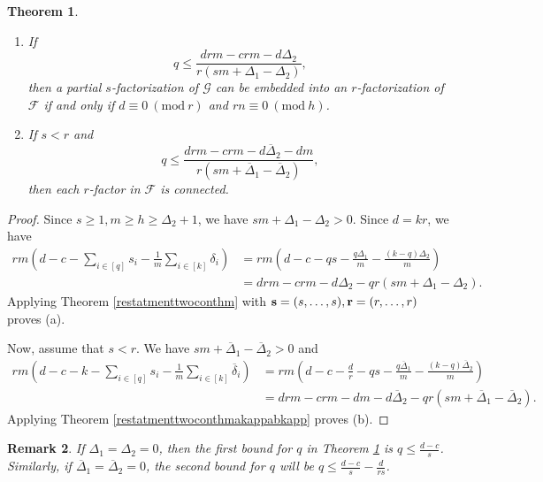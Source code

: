 \documentclass[12pt,oneside]{amsart}
\newtheorem{theorem}{Theorem}[section]
\newtheorem{remark}[theorem]{Remark}
\newcommand{\Mod}[1]{\ (\mathrm{mod}\ #1)}
\newcommand{\cc}{\mathcal}
\begin{document}
\begin{theorem} \label{rssimpleineqthm}
\begin{enumerate}
    \item [\textup{(a)}] If $$q\leq \dfrac{drm-crm- d \Delta_2}{r(sm+\Delta_1-\Delta_2)},$$ then  a partial $s$-factorization of $\cc G$ can be embedded into an  $r$-factorization of $\cc F$  if and only if $d\equiv 0 \Mod r$ and $rn\equiv 0 \Mod h$. 
    \item [\textup{(b)}] If $s<r$ and
$$q\leq \frac{drm-crm-d\overline{\Delta}_2-dm}{r(sm+\overline{\Delta}_1-\overline{\Delta}_2)},$$ 
then  each  $r$-factor in  $\cc F$ is connected. 
\end{enumerate}
\end{theorem}
\begin{proof} Since $s\geq 1, m\geq h \geq \Delta_2+1$, we have $sm+\Delta_1-\Delta_2> 0$. Since $d=kr$, we have
\begin{align*}
rm \left(d-c- \sum_{i\in [q]} s_i -\frac{1}{m}\sum_{i\in [k]} \delta_i\right)&=rm\left( d-c-qs-\frac{q\Delta_1}{m}-\frac{(k-q)\Delta_2}{m} \right)\\
&=drm-crm-d\Delta_2 -qr(sm+\Delta_1-\Delta_2).
\end{align*}
Applying Theorem \ref{restatmenttwoconthm} with $\vb{s}=(s,\dots,s),\vb{r}=(r,\dots,r)$ proves (a). 

Now, assume that $s<r$. We have $sm+\overline{\Delta}_1-\overline{\Delta}_2> 0$ and 
\begin{align*}
rm\left(d-c-k- \sum_{i\in [q]} s_i -\frac{1}{m}\sum_{i\in [k]} \overline{\delta}_i\right)&=rm\left(d-c-\frac{d}{r}- qs -\frac{q\overline{\Delta}_1}{m}-\frac{(k-q)\overline{\Delta}_2}{m}\right)\\
&=drm-crm-dm-d\overline{\Delta}_2-qr(sm+\overline{\Delta}_1-\overline{\Delta}_2).
\end{align*}
Applying Theorem \ref{restatmenttwoconthmakappabkapp} proves (b). 
\end{proof}
\begin{remark}
If $\Delta_1=\Delta_2=0$,  then  the first bound for $q$ in Theorem \ref{rssimpleineqthm} is $q\leq \frac{d-c}{s}$. Similarly, if $\overline{\Delta}_1=\overline{\Delta}_2=0$,  the second bound for $q$ will be $q\leq \frac{d-c}{s}-\frac{d}{rs}$.
\end{remark}
\end{document}
